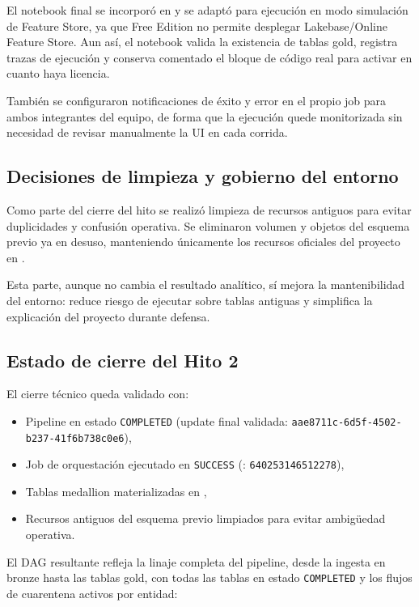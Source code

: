 \documentclass[12pt,a4paper]{article}
\begin{document}
El notebook final se incorporó en  y se adaptó para ejecución en modo simulación de Feature Store, ya que Free Edition no permite desplegar Lakebase/Online Feature Store. Aun así, el notebook valida la existencia de tablas gold, registra trazas de ejecución y conserva comentado el bloque de código real para activar en cuanto haya licencia.

También se configuraron notificaciones de éxito y error en el propio job para ambos integrantes del equipo, de forma que la ejecución quede monitorizada sin necesidad de revisar manualmente la UI en cada corrida.

\subsection{Decisiones de limpieza y gobierno del entorno}

Como parte del cierre del hito se realizó limpieza de recursos antiguos para evitar duplicidades y confusión operativa. Se eliminaron volumen y objetos del esquema previo ya en desuso, manteniendo únicamente los recursos oficiales del proyecto en .

Esta parte, aunque no cambia el resultado analítico, sí mejora la mantenibilidad del entorno: reduce riesgo de ejecutar sobre tablas antiguas y simplifica la explicación del proyecto durante defensa.

\subsection{Estado de cierre del Hito 2}

El cierre técnico queda validado con:
\begin{itemize}
    \item Pipeline en estado \texttt{COMPLETED} (update final validada: \texttt{aae8711c-6d5f-4502-b237-41f6b738c0e6}),
    \item Job de orquestación ejecutado en \texttt{SUCCESS} (: \texttt{640253146512278}),
    \item Tablas medallion materializadas en ,
    \item Recursos antiguos del esquema previo limpiados para evitar ambigüedad operativa.
\end{itemize}

El DAG resultante refleja la linaje completa del pipeline, desde la ingesta en bronze hasta las tablas gold, con todas las tablas en estado \texttt{COMPLETED} y los flujos de cuarentena activos por entidad:
\end{document}
